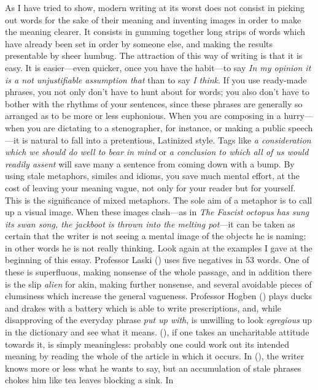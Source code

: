As I have tried to show, modern writing at its worst does not consist
in picking out words for the sake of their meaning and inventing
images in order to make the meaning clearer. It consists in gumming
together long strips of words which have already been set in order by
someone else, and making the results presentable by sheer humbug. The
attraction of this way of writing is that it is easy. It is
easier---even quicker, once you have the habit---to say \textit{In my
opinion it is a not unjustifiable assumption that} than to say
\textit{I think}. If you use ready-made phrases, you not only don't
have to hunt about for words; you also don't have to bother with the
rhythms of your sentences, since these phrases are generally so
arranged as to be more or less euphonious. When you are composing in a
hurry---when you are dictating to a stenographer, for instance, or
making a public speech---it is natural to fall into a pretentious,
Latinized style. Tags like \textit{a consideration which we should do
well to bear in mind} or \textit{a conclusion to which all of us would
readily assent} will save many a sentence from coming down with a
bump. By using stale metaphors, similes and idioms, you save much
mental effort, at the cost of leaving your  meaning vague,
not only for your reader but for yourself. This is the significance of
mixed metaphors. The sole aim of a metaphor is to call up a visual
image. When these images clash---as in \textit{The Fascist octopus has
sung its swan song, the jackboot is thrown into the melting pot}---it
can be taken as certain that the writer is not seeing a mental image
of the objects he is naming; in other words he is not really thinking.
Look again at the examples I gave at the beginning of this essay.
Professor Laski () uses five negatives in 53 words. One of
these is superfluous, making nonsense of the whole passage, and in
addition there is the slip \textit{alien} for akin, making further
nonsense, and several avoidable pieces of clumsiness which increase
the general vagueness. Professor Hogben () plays ducks and
drakes with a battery which is able to write prescriptions, and, while
disapproving of the everyday phrase \textit{put up with}, is unwilling
to look \textit{egregious} up in the dictionary and see what it means.
(), if one takes an uncharitable attitude towards it, is simply
meaningless: probably one could work out its intended meaning by
reading the whole of the article in which it occurs. In (), the
writer knows more or less what he wants to say, but an accumulation of
stale phrases chokes him like tea leaves blocking a sink. In
